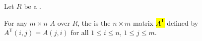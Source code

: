 \begin{definition} \label{definition:transpose_of_a_matrix_over_a_ring}
    Let $R$ be a .

    For any $m \times n$  $A$ over $R$, the  is the $n \times m$ matrix \hl{$A^{\mathsf{T}}$} defined by $A^{\mathsf{T}}(i,j) = A(j,i)$ for all $1 \leq i \leq n$, $1 \leq j \leq m$.
\end{definition}
